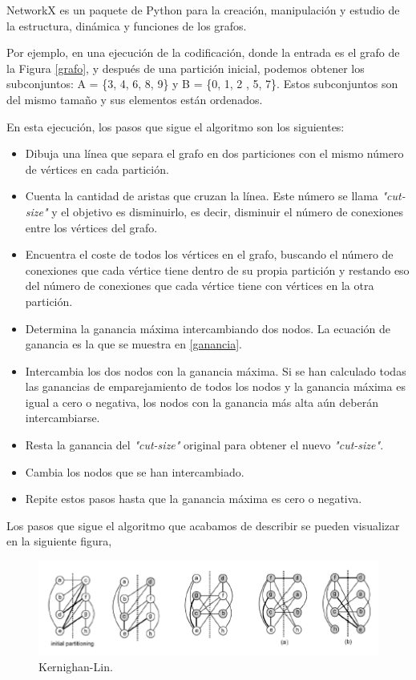 \begin{mydef}\label{NetworkX}
	NetworkX es un paquete de Python para la creación, manipulación y estudio de la estructura, dinámica y funciones de los grafos. 
\end{mydef}

Por ejemplo, en una ejecución de la codificación, donde la entrada es el grafo de la Figura \ref{grafo}, y después de una partición inicial, podemos obtener los subconjuntos: A = \{3, 4, 6, 8, 9\} y B = \{0, 1, 2 , 5, 7\}. Estos subconjuntos son del mismo tamaño y sus elementos están ordenados.

En esta ejecución, los pasos que sigue el algoritmo son los siguientes:

\begin{itemize}
	\item Dibuja una línea que separa el grafo en dos particiones con el mismo número de vértices en cada partición.
	\item Cuenta la cantidad de aristas que cruzan la línea. Este número se llama \textit{"cut-size"} y el objetivo es disminuirlo, es decir, disminuir el número de conexiones entre los vértices del grafo.
	\item Encuentra el coste de todos los vértices en el grafo, buscando el número de conexiones que cada vértice tiene dentro de su propia partición y restando eso del número de conexiones que cada vértice tiene con vértices en la otra partición.
	\item Determina la ganancia máxima intercambiando dos nodos. La ecuación de ganancia es la que se muestra en \ref{ganancia}.
	\item Intercambia los dos nodos con la ganancia máxima. Si se han calculado todas las ganancias de emparejamiento de todos los nodos y la ganancia máxima es igual a cero o negativa, los nodos con la ganancia más alta aún deberán intercambiarse.
	\item Resta la ganancia del \textit{"cut-size"} original para obtener el nuevo \textit{"cut-size"}.
	\item Cambia los nodos que se han intercambiado.
	\item Repite estos pasos hasta que la ganancia máxima es cero o negativa.
\end{itemize}

\newpage
Los pasos que sigue el algoritmo que acabamos de describir se pueden visualizar en la siguiente figura,

\begin{figure}[h]
	\centering
	\includegraphics[scale=0.9]{Figures/KL_steps}
	\vspace{1mm}
	\caption{Kernighan-Lin.}
	\label{KL_steps}
\end{figure}


